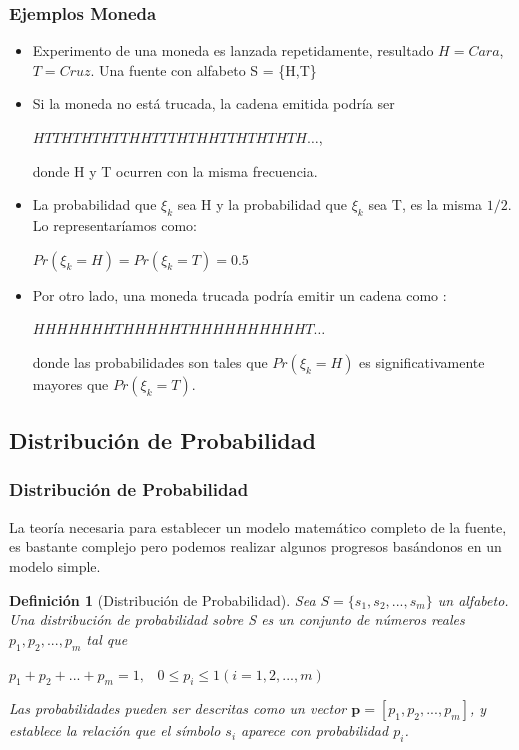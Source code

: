 \documentclass{beamer}
\newtheorem{definicion} [Definicion]{Definición}
\begin{document}


\begin{frame}\frametitle{Ejemplos Moneda}      \small

 \begin{itemize}

 \item  Experimento de una moneda es lanzada repetidamente, resultado $H = Cara$, $T = Cruz$. Una fuente con alfabeto S = \{H,T\}

 \item Si la moneda no está trucada, la cadena emitida podría ser

\begin{center}
$HTTHTHTHTTHHTTTHTHHTTHTHTHTH \ldots$,
\end{center}

donde H y T ocurren con la misma frecuencia. 

 \item La probabilidad que $\xi_k$ sea H y la probabilidad que $\xi_k$ sea T, es la misma $1/2$. Lo representaríamos como:
\begin{center}
$Pr(\xi_k =H) = Pr(\xi_k =T)=0.5$
\end{center}

 \item Por otro lado, una moneda trucada podría emitir un cadena como :
\begin{center}
$HHHHHHHTHHHHHTHHHHHHHHHHT \ldots$
\end{center}

donde las probabilidades son tales que $Pr(\xi_k =H)$ es significativamente mayores que $Pr(\xi_k =T)$.

\end{itemize}
\end{frame}


\subsection{Distribución de Probabilidad}
\begin{frame} \frametitle{Distribución de Probabilidad}     \small
 
 
 La teoría necesaria para establecer un modelo matemático completo de la fuente, es bastante complejo pero podemos realizar algunos progresos basándonos en un modelo simple.


\begin{definicion}[Distribución de Probabilidad]
Sea  $S =\{s_1, s_2, . . . , s_m\}$ un alfabeto. Una distribución de probabilidad sobre S es un conjunto de números reales $p_1,p_2,...,p_m$ tal que 
\begin{center}
$p_1 +p_2 + ... +p_m =1, \;\;\;	0\leq p_i \leq 1 (i=1,2,...,m)$
\end{center}

Las probabilidades pueden ser descritas como un vector  $\mathbf{p} = [p_1, p_2, . . . , p_m]$, y establece la relación que el símbolo $s_i$ aparece con probabilidad $p_i$.
\end{definicion}


\end{frame}
\end{document}
